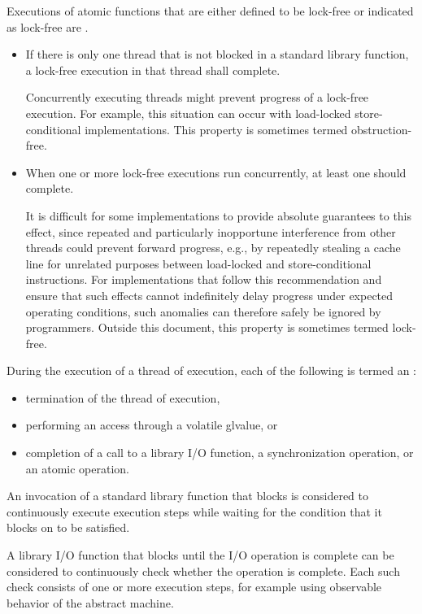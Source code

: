 \pnum
Executions of atomic functions
that are either defined to be lock-free
or indicated as lock-free
are .
\begin{itemize}
\item
  If there is only one thread that is not blocked
  in a standard library function,
  a lock-free execution in that thread shall complete.
  \begin{note}
    Concurrently executing threads
    might prevent progress of a lock-free execution.
    For example,
    this situation can occur
    with load-locked store-conditional implementations.
    This property is sometimes termed obstruction-free.
  \end{note}
\item
  When one or more lock-free executions run concurrently,
  at least one should complete.
  \begin{note}
    It is difficult for some implementations
    to provide absolute guarantees to this effect,
    since repeated and particularly inopportune interference
    from other threads
    could prevent forward progress,
    e.g.,
    by repeatedly stealing a cache line
    for unrelated purposes
    between load-locked and store-conditional instructions.
    For implementations that follow this recommendation and
    ensure that such effects cannot indefinitely delay progress
    under expected operating conditions,
    such anomalies
    can therefore safely be ignored by programmers.
    Outside this document,
    this property is sometimes termed lock-free.
  \end{note}
\end{itemize}

\pnum
During the execution of a thread of execution, each of the following is termed
an :
\begin{itemize}
\item termination of the thread of execution,
\item performing an access through a volatile glvalue, or
\item completion of a call to a library I/O function, a
      synchronization operation, or an atomic operation.
\end{itemize}

\pnum
An invocation of a standard library function that blocks
is considered to continuously execute execution steps while waiting for the
condition that it blocks on to be satisfied.
\begin{example}
A library I/O function that blocks until the I/O operation is complete can
be considered to continuously check whether the operation is complete. Each
such check consists of one or more execution steps, for example using
observable behavior of the abstract machine.
\end{example}

